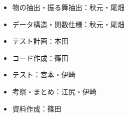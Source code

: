 \begin{itemize}
  \item 物の抽出・振る舞抽出：秋元・尾畑
  \item データ構造・関数仕様：秋元・尾畑
  \item テスト計画：本田
  \item コード作成：篠田
  \item テスト：宮本・伊崎
  \item 考察・まとめ：江尻・伊崎
  \item 資料作成：篠田
\end{itemize}
